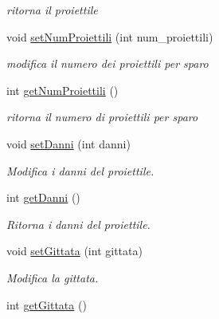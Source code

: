 \begin{DoxyCompactItemize}
\begin{DoxyCompactList}\small\item\em ritorna il proiettile \end{DoxyCompactList}\item 
\hypertarget{classArma_a20bcc2beb289293c2ff669347dd85ee7}{}void \hyperlink{classArma_a20bcc2beb289293c2ff669347dd85ee7}{set\+Num\+Proiettili} (int num\+\_\+proiettili)\label{classArma_a20bcc2beb289293c2ff669347dd85ee7}

\begin{DoxyCompactList}\small\item\em modifica il numero dei proiettili per sparo \end{DoxyCompactList}\item 
\hypertarget{classArma_a46027b1bc5b511f90576263dc956f6e3}{}int \hyperlink{classArma_a46027b1bc5b511f90576263dc956f6e3}{get\+Num\+Proiettili} ()\label{classArma_a46027b1bc5b511f90576263dc956f6e3}

\begin{DoxyCompactList}\small\item\em ritorna il numero di proiettili per sparo \end{DoxyCompactList}\item 
void \hyperlink{classArma_abbd285ffdc68150ef63ee5e650bfad3a}{set\+Danni} (int danni)
\begin{DoxyCompactList}\small\item\em Modifica i danni del proiettile. \end{DoxyCompactList}\item 
\hypertarget{classArma_ad78847c9570cb90498f22cd58a32254b}{}int \hyperlink{classArma_ad78847c9570cb90498f22cd58a32254b}{get\+Danni} ()\label{classArma_ad78847c9570cb90498f22cd58a32254b}

\begin{DoxyCompactList}\small\item\em Ritorna i danni del proiettile. \end{DoxyCompactList}\item 
void \hyperlink{classArma_a5a963f9968090740359a6f10f3cee9a3}{set\+Gittata} (int gittata)
\begin{DoxyCompactList}\small\item\em Modifica la gittata. \end{DoxyCompactList}\item 
\hypertarget{classArma_ad896d068368f7fe332e7ec37e9d7cafb}{}int \hyperlink{classArma_ad896d068368f7fe332e7ec37e9d7cafb}{get\+Gittata} ()\label{classArma_ad896d068368f7fe332e7ec37e9d7cafb}


\end{DoxyCompactItemize}
